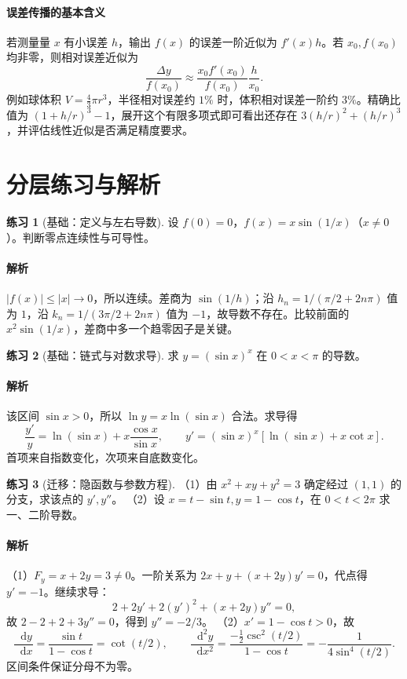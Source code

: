 \documentclass[UTF8,fontset=fandol,12pt,oneside,openany]{ctexrep}
\newcommand{\dd}{\mathop{}\!\mathrm d}
\theoremstyle{definition}
\newtheorem{exercise}{练习}[chapter]
\begin{document}
\paragraph{误差传播的基本含义}
若测量量 $x$ 有小误差 $h$，输出 $f(x)$ 的误差一阶近似为 $f'(x)h$。若 $x_0,f(x_0)$ 均非零，则相对误差近似为
\[
 \frac{\Delta y}{f(x_0)}\approx
 \frac{x_0f'(x_0)}{f(x_0)}\frac h{x_0}.
\]
例如球体积 $V=\tfrac43\pi r^3$，半径相对误差约 $1\%$ 时，体积相对误差一阶约 $3\%$。精确比值为 $(1+h/r)^3-1$，展开这个有限多项式即可看出还存在 $3(h/r)^2+(h/r)^3$，并评估线性近似是否满足精度要求。

\section{分层练习与解析}
\label{lec:05:exercises}

\begin{exercise}[基础：定义与左右导数]
设 $f(0)=0$，$f(x)=x\sin(1/x)$（$x\ne0$）。判断零点连续性与可导性。
\end{exercise}
\paragraph{解析}$|f(x)|\le|x|\to0$，所以连续。差商为 $\sin(1/h)$；沿 $h_n=1/(\pi/2+2n\pi)$ 值为 $1$，沿 $k_n=1/(3\pi/2+2n\pi)$ 值为 $-1$，故导数不存在。比较前面的 $x^2\sin(1/x)$，差商中多一个趋零因子是关键。

\begin{exercise}[基础：链式与对数求导]
求 $y=(\sin x)^x$ 在 $0<x<\pi$ 的导数。
\end{exercise}
\paragraph{解析}该区间 $\sin x>0$，所以 $\ln y=x\ln(\sin x)$ 合法。求导得
\[
 \frac{y'}y=\ln(\sin x)+x\frac{\cos x}{\sin x},\qquad
 y'=(\sin x)^x[\ln(\sin x)+x\cot x].
\]
首项来自指数变化，次项来自底数变化。

\begin{exercise}[迁移：隐函数与参数方程]
（1）由 $x^2+xy+y^2=3$ 确定经过 $(1,1)$ 的分支，求该点的 $y',y''$。
（2）设 $x=t-\sin t,y=1-\cos t$，在 $0<t<2\pi$ 求一、二阶导数。
\end{exercise}
\paragraph{解析}（1）$F_y=x+2y=3\ne0$。一阶关系为
$2x+y+(x+2y)y'=0$，代点得 $y'=-1$。继续求导：
\[
 2+2y'+2(y')^2+(x+2y)y''=0,
\]
故 $2-2+2+3y''=0$，得到 $y''=-2/3$。
（2）$x'=1-\cos t>0$，故
\[
 \frac{\dd y}{\dd x}=\frac{\sin t}{1-\cos t}=\cot(t/2),\qquad
 \frac{\dd^2y}{\dd x^2}
 =\frac{-\tfrac12\csc^2(t/2)}{1-\cos t}
 =-\frac1{4\sin^4(t/2)}.
\]
区间条件保证分母不为零。
\end{document}
